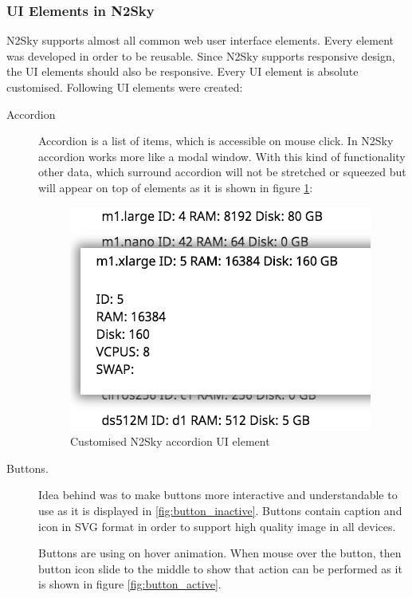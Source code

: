 \subsubsection{UI Elements in N2Sky}\label{UI Elements in N2Sky}

N2Sky supports almost all common web user interface elements. Every element was developed in order to be reusable. Since N2Sky supports responsive design, the UI elements should also be responsive. Every UI element is absolute customised. Following UI elements were created:

\begin{description}
\item[Accordion]  Accordion is a list of items, which is accessible on mouse click. In N2Sky accordion works more like a modal window. With this kind of functionality other data, which surround accordion will not be stretched or squeezed but will appear on top of elements as it is shown in figure \ref{fig:accordion}: 

\begin{figure}[htbp]
\begin{center}
  \includegraphics[scale=0.75]{components/3/components/accordion.png}
  \caption{Customised N2Sky accordion UI element}
  \label{fig:accordion}
\end{center}
\end{figure}

\item[Buttons.] Idea behind was to make buttons more interactive and understandable to use as it is displayed in \ref{fig:button_inactive}. Buttons contain caption and icon in SVG format in order to support high quality image in all devices.

Buttons are using on hover animation. When mouse over the button, then button icon slide to the middle to show that action can be performed as it is shown in figure \ref{fig:button_active}. 


\end{description}
